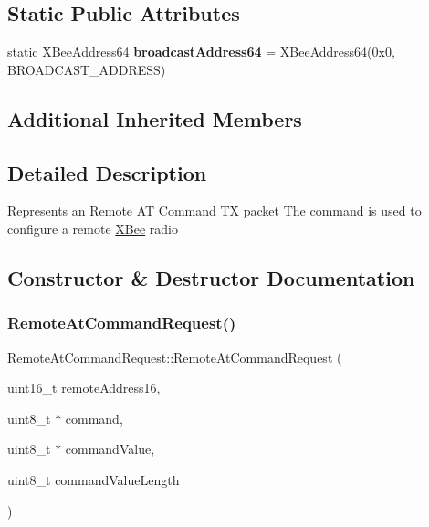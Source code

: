 \subsection*{Static Public Attributes}
\begin{DoxyCompactItemize}
\item 
\hypertarget{class_remote_at_command_request_a72668f0e22df605d5b32141bd7ca0256}{}\label{class_remote_at_command_request_a72668f0e22df605d5b32141bd7ca0256} 
static \hyperlink{class_x_bee_address64}{X\+Bee\+Address64} {\bfseries broadcast\+Address64} = \hyperlink{class_x_bee_address64}{X\+Bee\+Address64}(0x0, B\+R\+O\+A\+D\+C\+A\+S\+T\+\_\+\+A\+D\+D\+R\+E\+S\+S)
\end{DoxyCompactItemize}
\subsection*{Additional Inherited Members}


\subsection{Detailed Description}
Represents an Remote AT Command TX packet The command is used to configure a remote \hyperlink{class_x_bee}{X\+Bee} radio 

\subsection{Constructor \& Destructor Documentation}
\hypertarget{class_remote_at_command_request_ac6977fe584bab7d7414b0c45d1ae37cc}{}\label{class_remote_at_command_request_ac6977fe584bab7d7414b0c45d1ae37cc} 
\subsubsection{\texorpdfstring{Remote\+At\+Command\+Request()}{RemoteAtCommandRequest()}\hspace{0.1cm}{\footnotesize\ttfamily [1/4]}}
{\footnotesize\ttfamily Remote\+At\+Command\+Request\+::\+Remote\+At\+Command\+Request (\begin{DoxyParamCaption}\item[{uint16\+\_\+t}]{remote\+Address16,  }\item[{uint8\+\_\+t $\ast$}]{command,  }\item[{uint8\+\_\+t $\ast$}]{command\+Value,  }\item[{uint8\+\_\+t}]{command\+Value\+Length }\end{DoxyParamCaption})}

